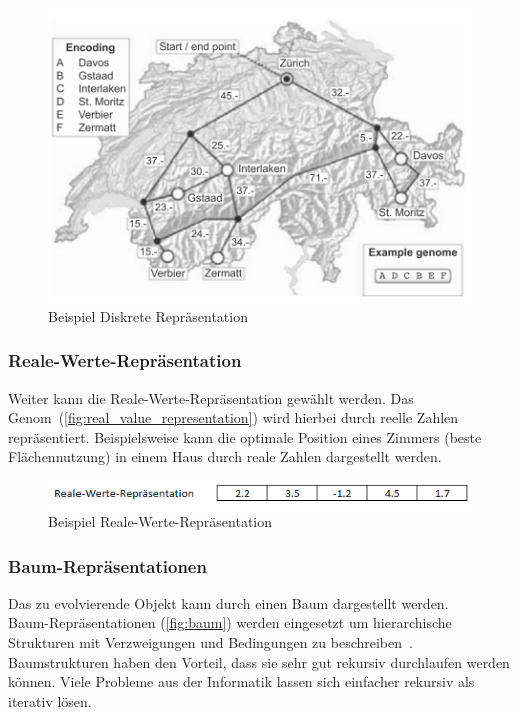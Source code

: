         \begin{figure}[H]
          \includegraphics[scale=0.9,center]{graphics/discret_representation}
          \caption[\protect{}, S.18]{Beispiel Diskrete Repräsentation\label{fig:travelling}}
        \end{figure}

      \subsubsection{Reale-Werte-Repräsentation\label{subsub:GeneticRepresentationReal}}

        Weiter kann die Reale-Werte-Repräsentation gewählt werden.
        Das Genom~(\vref{fig:real_value_representation}) wird hierbei durch reelle Zahlen repräsentiert.
        Beispielsweise kann die optimale Position eines Zimmers (beste Flächennutzung) in einem Haus
        durch reale Zahlen dargestellt werden.

        \begin{figure}[H]
          \includegraphics[scale=1,center]{graphics/real_value_representation}
          \caption{Beispiel Reale-Werte-Repräsentation\label{fig:real_value_representation}}
        \end{figure}

      \subsubsection{Baum-Repräsentationen\label{subsub:GeneticRepresentationTree}}

        Das zu evolvierende Objekt kann durch einen Baum dargestellt werden.
        \\
        Baum-Repräsentationen (\vref{fig:baum}) werden eingesetzt
        um hierarchische Strukturen mit Verzweigungen und Bedingungen zu beschreiben~\cite[S.19]{book:bioInspired}.
        Baumstrukturen haben den Vorteil, dass sie sehr gut rekursiv durchlaufen werden können.
        Viele Probleme aus der Informatik lassen sich einfacher rekursiv als iterativ lösen.

